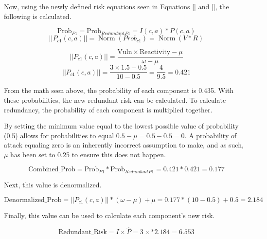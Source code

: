 Now, using the newly defined risk equations seen in Equations \ref{} and \ref{}, the following is calculated.

\[
\text{Prob}_{\!P1}
   =\text{Prob}_{\!RedundantP1}
   = I(c,a)*P(c,a)\]
\[   
   ||P_{c1}(c,a)||=\operatorname{Norm}(Prob_{c1})=\operatorname{Norm}(V*R)\]

\[
   ||P_{c1}(c,a)||=\frac{\text{Vuln}\times\text{Reactivity}-\mu}{\omega-\mu}\]
   \[
   ||P_{c1}(c,a)||=\frac{3\times1.5-0.5}{10-0.5}
   =\frac{4}{9.5}
   =0.421
\]

From the math seen above, the probability of each component is 0.435. With these probabilities, the new redundant risk can be calculated. To calculate redundancy, the probability of each component is multiplied together.

By setting the minimum value equal to the lowest possible value of probability (0.5) allows for probabilities to equal $0.5-\mu=0.5-0.5=0$. A probability of attack equaling zero is an inherently incorrect assumption to make, and as such, $\mu$ has been set to 0.25 to ensure this does not happen.

\[
\text{Combined\_Prob}
   =\text{Prob}_{\!P1}*\text{Prob}_{\!RedundantP1}
   =0.421*0.421
   =0.177
\]

Next, this value is denormalized.

\[
\text{Denormalized\_Prob}
   =||P_{c1}(c,a)||*(\omega-\mu)+\mu
   =0.177*(10-0.5)+0.5
   =2.184
\]

Finally, this value can be used to calculate each component's new risk.

\[
\text{Redundant\_Risk}
   =I\times\widehat{P}
   =3\times*2.184
   =6.553
\]













